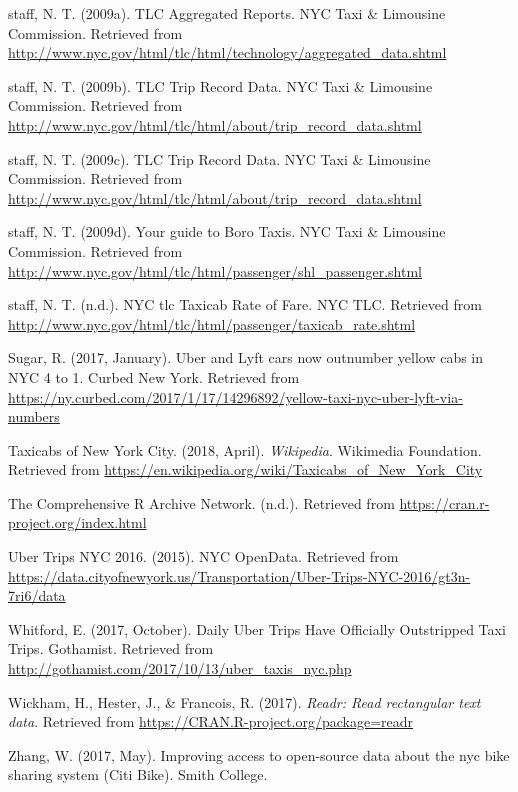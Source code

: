\documentclass[12pt,twoside]{reedthesis}
\theoremstyle{definition}
\theoremstyle{definition}
\theoremstyle{definition}
\theoremstyle{remark}
\begin{document}
\hypertarget{ref-datayellowmonth}{}
staff, N. T. (2009a). TLC Aggregated Reports. NYC Taxi \& Limousine
Commission. Retrieved from
\url{http://www.nyc.gov/html/tlc/html/technology/aggregated_data.shtml}

\hypertarget{ref-datayellow}{}
staff, N. T. (2009b). TLC Trip Record Data. NYC Taxi \& Limousine
Commission. Retrieved from
\url{http://www.nyc.gov/html/tlc/html/about/trip_record_data.shtml}

\hypertarget{ref-datauber}{}
staff, N. T. (2009c). TLC Trip Record Data. NYC Taxi \& Limousine
Commission. Retrieved from
\url{http://www.nyc.gov/html/tlc/html/about/trip_record_data.shtml}

\hypertarget{ref-greentaxi}{}
staff, N. T. (2009d). Your guide to Boro Taxis. NYC Taxi \& Limousine
Commission. Retrieved from
\url{http://www.nyc.gov/html/tlc/html/passenger/shl_passenger.shtml}

\hypertarget{ref-tlcfarerate}{}
staff, N. T. (n.d.). NYC tlc Taxicab Rate of Fare. NYC TLC. Retrieved
from \url{http://www.nyc.gov/html/tlc/html/passenger/taxicab_rate.shtml}

\hypertarget{ref-sugar2017}{}
Sugar, R. (2017, January). Uber and Lyft cars now outnumber yellow cabs
in NYC 4 to 1. Curbed New York. Retrieved from
\url{https://ny.curbed.com/2017/1/17/14296892/yellow-taxi-nyc-uber-lyft-via-numbers}

\hypertarget{ref-wikipediataxi}{}
Taxicabs of New York City. (2018, April). \emph{Wikipedia}. Wikimedia
Foundation. Retrieved from
\url{https://en.wikipedia.org/wiki/Taxicabs_of_New_York_City}

\hypertarget{ref-cran}{}
The Comprehensive R Archive Network. (n.d.). Retrieved from
\url{https://cran.r-project.org/index.html}

\hypertarget{ref-datauberweek}{}
Uber Trips NYC 2016. (2015). NYC OpenData. Retrieved from
\url{https://data.cityofnewyork.us/Transportation/Uber-Trips-NYC-2016/gt3n-7ri6/data}

\hypertarget{ref-emma2017}{}
Whitford, E. (2017, October). Daily Uber Trips Have Officially
Outstripped Taxi Trips. Gothamist. Retrieved from
\url{http://gothamist.com/2017/10/13/uber_taxis_nyc.php}

\hypertarget{ref-pkgreadr}{}
Wickham, H., Hester, J., \& Francois, R. (2017). \emph{Readr: Read
rectangular text data}. Retrieved from
\url{https://CRAN.R-project.org/package=readr}

\hypertarget{ref-zhang2017}{}
Zhang, W. (2017, May). Improving access to open-source data about the
nyc bike sharing system (Citi Bike). Smith College.


\end{document}
